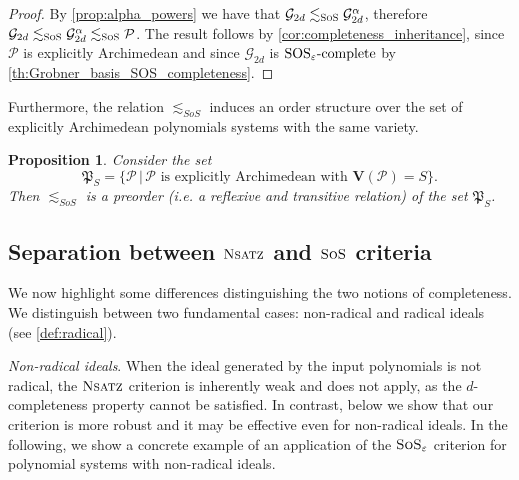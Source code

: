 \documentclass[11pt]{article}
\newcommand{\sos}{\text{\sc{SoS}}}
\newcommand{\Nsatz}{\textsc{Nsatz}}
\newcommand{\Variety}[1]{{\textbf{V}}\left( #1 \right)}
\newcommand{\1}{\textbf{1}}
\newtheorem{proposition}[theorem]{Proposition}
\newcommand{\SOSe}{\rm{SOS}_\varepsilon\text{-complete}}
\begin{document}
\begin{proof}
    By \cref{prop:alpha_powers} we have that $\mathcal{G}_{2d} \lesssim_{\sos} \mathcal{G}_{2d}^{\alpha}$, therefore $\mathcal{G}_{2d} \lesssim_{\sos} \mathcal{G}_{2d}^{\alpha} \lesssim_{\sos} \mathcal{P}$. The result follows by \cref{cor:completeness_inheritance}, since $\mathcal{P}$ is explicitly Archimedean and since $\mathcal{G}_{2d}$ is $\SOSe$ by \cref{th:Grobner_basis_SOS_completeness}.
\end{proof}

Furthermore, the relation $\lesssim_{SoS}$ induces an order structure over the set of explicitly Archimedean polynomials systems with the same variety.

\begin{proposition}
    Consider the set
    \begin{equation*}
        \mathfrak{P}_{S} = \{ \mathcal{P} \, | \, \text{$\mathcal{P}$ is explicitly Archimedean with $\Variety{\mathcal{P}} = S$}\}.
    \end{equation*}
    Then $\lesssim_{SoS}$ is a \emph{preorder} (i.e. a reflexive and transitive relation) of the set $\mathfrak{P}_S$.
\end{proposition}

\subsection[Separation between Nsatz and SoS]{Separation between $\Nsatz$ and $\sos$ criteria}\label{sect:separation_Nsatz_SOS}


We now highlight some differences distinguishing the two notions of completeness. We distinguish between two fundamental cases: non-radical and radical ideals (see \cref{def:radical}).

\textit{Non-radical ideals}. When the ideal generated by the input polynomials is not radical, the $\Nsatz$ criterion is inherently weak and does not apply, as the $d$-completeness property cannot be satisfied. In contrast, below we show that our criterion is more robust and it may be effective even for non-radical ideals. 
In the following, we show a concrete example of an application of the $\sos_{\varepsilon}$ criterion for polynomial systems with non-radical ideals.
\end{document}
